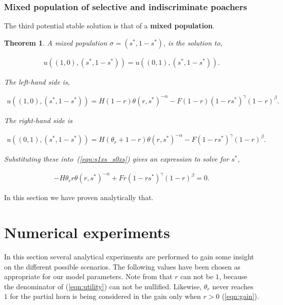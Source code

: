 \documentclass[10pt]{article}
\newtheorem{theorem}{Theorem}
\begin{document}
\subsubsection{Mixed population of selective and indiscriminate poachers}

The third potential stable solution is that of a \textbf{mixed population}.

\begin{theorem}
	A mixed population \(\sigma = (s^*, 1 - s^*)\), is the solution to,

	\begin{eqnarray}
	\label{eqn:s1xs_s0xs}
	u((1, 0),(s^*, 1 - s^*)) = u((0, 1),(s^*, 1 - s^*)).
	\end{eqnarray}

	The left-hand side is,

	\begin{eqnarray} \nonumber
	u((1, 0),(s^*, 1 - s^*)) =
	H(1 - r) \theta(r, s^*)^{-\alpha} - F (1 - r)(1 - rs^*)^{\gamma}(1 - r)^{\beta} .
	\end{eqnarray}

	The right-hand side is

	\begin{eqnarray} \nonumber
	u((0, 1),(s^*, 1 - s^*)) =
	H(\theta_r + 1 - r)\theta(r, s^*)^{-\alpha} - F(1 - rs^*)^{\gamma}(1 - r)^{\beta} .
	\end{eqnarray}

	Substituting these into~(\ref{eqn:s1xs_s0xs}) gives an expression to solve 
	for \(s^*\),

	\begin{eqnarray}
	\label{eqn:stablemixed}
	- H \theta_r r \theta(r, s^*)^{-\alpha}  + F r (1 - rs^*)^{\gamma}(1 - r)^{\beta} = 0.
	\end{eqnarray}

\end{theorem}

In this section we have proven analytically that. 

\section{Numerical experiments}\label{section:numerical_experiments}

In this section several analytical experiments are performed to gain some insight 
on the different possible scenarios. The following values have been chosen as
appropriate for our model parameters. Note from that \(r\) can not be \(1\), because 
the denominator of (\ref{eqn:utility}) can not be nullified. Likewise,  \(\theta_r\)
never reaches \(1\) for the partial horn is being considered in the gain only when 
\(r>0\) (\ref{eqn:gain}). 
\end{document}
